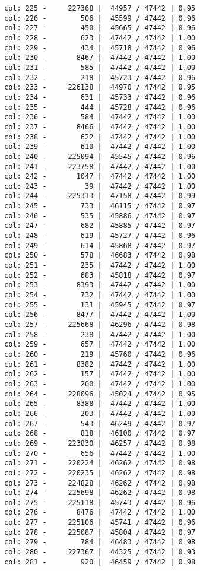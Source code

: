 \documentclass[11pt]{article}
\begin{document}
\begin{Verbatim}[commandchars=\\\{\}]
col: 225 -     227368 |  44957 / 47442 | 0.95
col: 226 -        506 |  45599 / 47442 | 0.96
col: 227 -        450 |  45665 / 47442 | 0.96
col: 228 -        623 |  47442 / 47442 | 1.00
col: 229 -        434 |  45718 / 47442 | 0.96
col: 230 -       8467 |  47442 / 47442 | 1.00
col: 231 -        585 |  47442 / 47442 | 1.00
col: 232 -        218 |  45723 / 47442 | 0.96
col: 233 -     226138 |  44970 / 47442 | 0.95
col: 234 -        631 |  45733 / 47442 | 0.96
col: 235 -        444 |  45728 / 47442 | 0.96
col: 236 -        584 |  47442 / 47442 | 1.00
col: 237 -       8466 |  47442 / 47442 | 1.00
col: 238 -        622 |  47442 / 47442 | 1.00
col: 239 -        610 |  47442 / 47442 | 1.00
col: 240 -     225094 |  45545 / 47442 | 0.96
col: 241 -     223758 |  47442 / 47442 | 1.00
col: 242 -       1047 |  47442 / 47442 | 1.00
col: 243 -         39 |  47442 / 47442 | 1.00
col: 244 -     225313 |  47158 / 47442 | 0.99
col: 245 -        733 |  46115 / 47442 | 0.97
col: 246 -        535 |  45886 / 47442 | 0.97
col: 247 -        682 |  45885 / 47442 | 0.97
col: 248 -        619 |  45727 / 47442 | 0.96
col: 249 -        614 |  45868 / 47442 | 0.97
col: 250 -        578 |  46683 / 47442 | 0.98
col: 251 -        235 |  47442 / 47442 | 1.00
col: 252 -        683 |  45818 / 47442 | 0.97
col: 253 -       8393 |  47442 / 47442 | 1.00
col: 254 -        732 |  47442 / 47442 | 1.00
col: 255 -        131 |  45945 / 47442 | 0.97
col: 256 -       8477 |  47442 / 47442 | 1.00
col: 257 -     225668 |  46296 / 47442 | 0.98
col: 258 -        238 |  47442 / 47442 | 1.00
col: 259 -        657 |  47442 / 47442 | 1.00
col: 260 -        219 |  45760 / 47442 | 0.96
col: 261 -       8382 |  47442 / 47442 | 1.00
col: 262 -        157 |  47442 / 47442 | 1.00
col: 263 -        200 |  47442 / 47442 | 1.00
col: 264 -     228096 |  45024 / 47442 | 0.95
col: 265 -       8388 |  47442 / 47442 | 1.00
col: 266 -        203 |  47442 / 47442 | 1.00
col: 267 -        543 |  46249 / 47442 | 0.97
col: 268 -        818 |  46100 / 47442 | 0.97
col: 269 -     223830 |  46257 / 47442 | 0.98
col: 270 -        656 |  47442 / 47442 | 1.00
col: 271 -     220224 |  46262 / 47442 | 0.98
col: 272 -     220235 |  46262 / 47442 | 0.98
col: 273 -     224828 |  46262 / 47442 | 0.98
col: 274 -     225698 |  46262 / 47442 | 0.98
col: 275 -     225118 |  45743 / 47442 | 0.96
col: 276 -       8476 |  47442 / 47442 | 1.00
col: 277 -     225106 |  45741 / 47442 | 0.96
col: 278 -     225087 |  45804 / 47442 | 0.97
col: 279 -        784 |  46483 / 47442 | 0.98
col: 280 -     227367 |  44325 / 47442 | 0.93
col: 281 -        920 |  46459 / 47442 | 0.98

\end{Verbatim}
\end{document}

